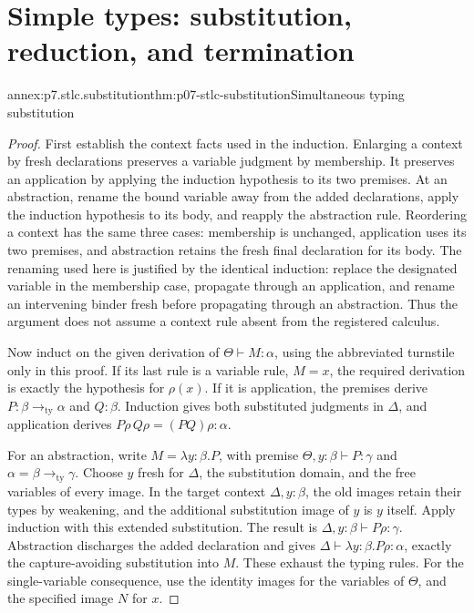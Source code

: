 \section{Simple types: substitution, reduction, and termination}

\begin{annexitem}{annex:p7.stlc.substitution}{thm:p07-stlc-substitution}{Simultaneous typing substitution}
\begin{proof}
First establish the context facts used in the induction. Enlarging a context
by fresh declarations preserves a variable judgment by membership. It
preserves an application by applying the induction hypothesis to its two
premises. At an abstraction, rename the bound variable away from the added
declarations, apply the induction hypothesis to its body, and reapply the
abstraction rule. Reordering a context has the same three cases: membership
is unchanged, application uses its two premises, and abstraction retains
the fresh final declaration for its body. The renaming used here is justified
by the identical induction: replace the designated variable in the membership
case, propagate through an application, and rename an intervening binder
fresh before propagating through an abstraction. Thus the argument does not
assume a context rule absent from the registered calculus.

Now induct on the given derivation of \(\Theta\vdash M:\alpha\), using
the abbreviated turnstile only in this proof. If its last rule is a variable
rule, \(M=x\), the required derivation is exactly the hypothesis for
\(\rho(x)\). If it is application, the premises derive
\(P:\beta\mathbin{\to_{\mathrm{ty}}}\alpha\) and \(Q:\beta\).
Induction gives both substituted judgments in \(\Delta\), and application
derives \(P\rho\,Q\rho=(PQ)\rho:\alpha\).

For an abstraction, write \(M=\lambda y{:}\beta.P\), with premise
\(\Theta,y:\beta\vdash P:\gamma\) and
\(\alpha=\beta\mathbin{\to_{\mathrm{ty}}}\gamma\).
Choose \(y\) fresh for \(\Delta\), the substitution domain, and the free
variables of every image. In the target context \(\Delta,y:\beta\), the
old images retain their types by weakening, and the additional substitution
image of \(y\) is \(y\) itself. Apply induction with this extended
substitution. The result is \(\Delta,y:\beta\vdash P\rho:\gamma\).
Abstraction discharges the added declaration and gives
\(\Delta\vdash\lambda y{:}\beta.P\rho:\alpha\), exactly the
capture-avoiding substitution into \(M\). These exhaust the typing rules.
For the single-variable consequence, use the identity images for the
variables of \(\Theta\), and the specified image \(N\) for \(x\).
\end{proof}
\end{annexitem}

